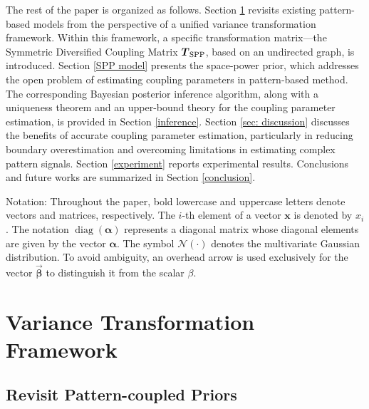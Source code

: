 \documentclass[lettersize,journal]{IEEEtran}
\theoremstyle{remark}
\begin{document}
The rest of the paper is organized as follows.
Section \ref{sec: variance} revisits existing pattern-based models from the perspective of a unified variance transformation framework. Within this framework, a specific transformation matrix—the Symmetric Diversified Coupling Matrix $\boldsymbol{T}_{\rm SPP}$, based on an undirected graph, is introduced.
Section \ref{SPP model} presents the space-power prior, which addresses the open problem of estimating coupling parameters in pattern-based method. The corresponding Bayesian posterior inference algorithm, along with a uniqueness theorem and an upper-bound theory for the coupling parameter estimation, is provided in Section \ref{inference}.
Section \ref{sec: discussion} discusses the benefits of accurate coupling parameter estimation, particularly in reducing boundary overestimation and overcoming limitations in estimating complex pattern signals.
Section \ref{experiment} reports experimental results. Conclusions and future works are summarized in Section \ref{conclusion}.

Notation: Throughout the paper, bold lowercase and uppercase letters denote vectors and matrices, respectively. The $i$-th element of a vector $\mathbf{x}$ is denoted by $x_i$. The notation  $\operatorname{diag}(\boldsymbol{\alpha})$ represents a diagonal matrix whose diagonal elements are given by the vector $\boldsymbol{\alpha}$. The symbol $\mathcal{N}(\cdot)$ denotes the multivariate Gaussian distribution.
To avoid ambiguity, an overhead arrow is used exclusively for the vector $\vec{\boldsymbol{\beta}}$ to distinguish it from the scalar $\beta$.



\section{Variance Transformation Framework} \label{sec: variance}

\subsection{Revisit Pattern-coupled Priors}
\end{document}

